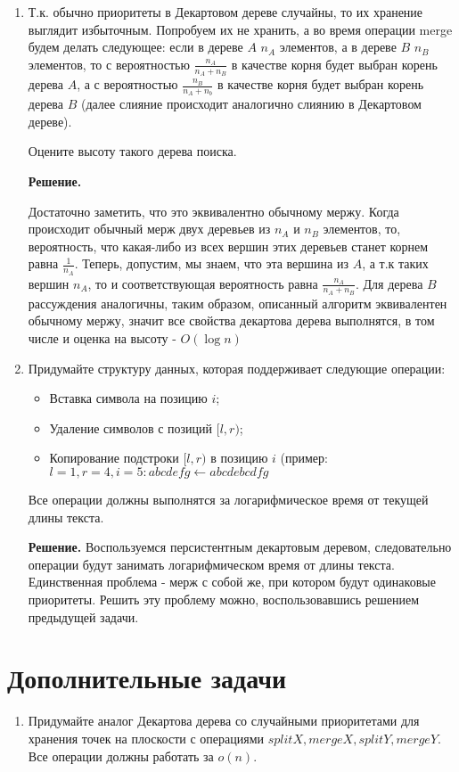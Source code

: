 \begin{enumerate}
	\item Т.к. обычно приоритеты в Декартовом дереве случайны, то их хранение выглядит избыточным.
	Попробуем их не хранить, а во время операции merge будем делать следующее: если в дереве
	$A$ $n_A$ элементов, а в дереве $B$ $n_B$ элементов, то с вероятностью 
	$\frac{n_A}{n_A + n_B}$ в качестве корня будет выбран корень дерева $A$, а с вероятностью 
	$\frac{n_B}{n_A + n_b}$ в качестве корня будет выбран корень дерева $B$ (далее слияние 
	происходит аналогично слиянию в Декартовом дереве).
	
	Оцените высоту такого дерева поиска.
	
	\textbf{Решение.}
	
	Достаточно заметить, что это эквивалентно обычному мержу. Когда происходит обычный мерж двух деревьев из 
	$n_A$ и $n_B$ элементов, то, вероятность, что какая-либо из всех вершин этих деревьев станет корнем равна 
	$\frac{1}{n_A}$. Теперь, допустим, мы знаем, что эта вершина из $A$, а т.к таких вершин $n_A$, то и 
	соответствующая вероятность равна $\frac{n_A}{n_A + n_B}$. Для дерева $B$ рассуждения аналогичны, таким 
	образом, описанный алгоритм эквивалентен обычному мержу, значит все свойства декартова дерева выполнятся, в 
	том числе и оценка на высоту - $O(\log n)$
	
	\item Придумайте структуру данных, которая поддерживает следующие операции:
	
	\begin{itemize}
		\item Вставка символа на позицию $i$;
		\item Удаление символов с позиций $[l, r)$;
		\item Копирование подстроки $[l, r)$ в позицию $i$ (пример: $l = 1, r = 4, i = 5 : abcdefg \leftarrow 
		abcdebcdfg$
	\end{itemize}
	
	Все операции должны выполнятся за логарифмическое время от текущей длины текста.
	
	\textbf{Решение.}
	Воспользуемся персистентным декартовым деревом, следовательно операции будут занимать логарифмическом время 
	от длины текста. Единственная проблема - мерж с собой же, при котором будут одинаковые приоритеты. Решить эту 
	проблему можно, воспользовавшись решением предыдущей задачи.
	
\end{enumerate}

\section*{Дополнительные задачи}
\begin{enumerate}
	\item Придумайте аналог Декартова дерева со случайными приоритетами для хранения точек на плоскости с 
	операциями $splitX, mergeX, splitY, mergeY$. Все операции должны работать за $o(n)$.
\end{enumerate}
